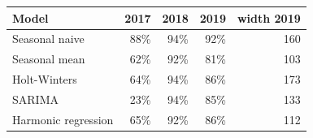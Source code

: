 \begin{tabular}{|l|r|r|r|r|}
\hline
\textbf{Model} & \textbf{2017} & \textbf{2018} & \textbf{2019} & \textbf{width 2019} \\\hline
Seasonal naive & 88\% & 94\% & 92\% & 160 \\\hline
Seasonal mean & 62\% & 92\% & 81\% & 103 \\\hline
Holt-Winters & 64\% & 94\% & 86\% & 173 \\\hline
SARIMA & 23\% & 94\% & 85\% & 133 \\\hline
Harmonic regression & 65\% & 92\% & 86\% & 112 \\\hline
\end{tabular}
